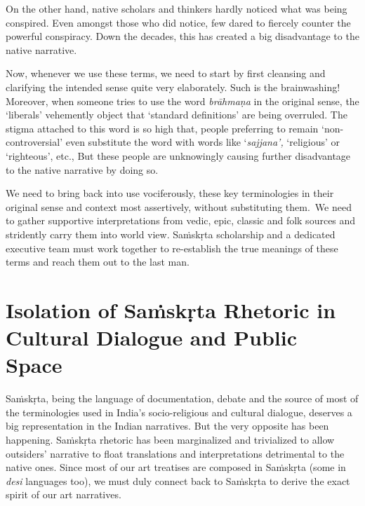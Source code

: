 On the other hand, native scholars and thinkers hardly noticed what was being conspired. Even amongst those who did notice, few dared to fiercely counter the powerful conspiracy. Down the decades, this has created a big disadvantage to the native narrative.

Now, whenever we use these terms, we need to start by first cleansing and clarifying the intended sense quite very elaborately. Such is the brainwashing! Moreover, when someone tries to use the word \textit{brāhmaṇa} in the original sense, the ‘liberals’ vehemently object that ‘standard definitions’ are being overruled. The stigma attached to this word is so high that, people preferring to remain ‘non-controversial’ even substitute the word with words like ‘\textit{sajjana’,} ‘religious’ or ‘righteous’, etc., But these people are unknowingly causing further disadvantage to the native narrative by doing so.

We need to bring back into use vociferously, these key terminologies in their original sense and context most assertively, without substituting them.~We need to gather supportive interpretations from vedic, epic, classic and folk sources and stridently carry them into world view. Saṁskṛta scholarship and a dedicated executive team must work together to re-establish the true meanings of these terms and reach them out to the last man.

\newpage

\vspace{-.3cm}

\section*{Isolation of Saṁskṛta Rhetoric in Cultural Dialogue and Public Space}

\vspace{-.2cm}

Saṁskṛta, being the language of documentation, debate and the source of most of the terminologies used in India’s socio-religious and cultural dialogue, deserves a big representation in the Indian narratives. But the very opposite has been happening. Saṁskṛta rhetoric has been marginalized and trivialized to allow outsiders’ narrative to float translations and interpretations detrimental to the native ones. Since most of our art treatises are composed in Saṁskṛta (some in \textit{desi} languages too), we must duly connect back to Saṁskṛta to derive the exact spirit of our art narratives.

